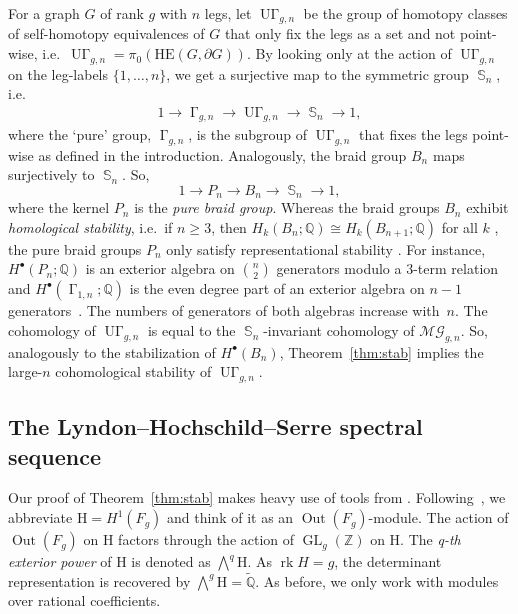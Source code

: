 \documentclass[oneside]{amsart}
\theoremstyle{remark}
\newcommand{\Q}{\mathbb{Q}}
\newcommand{\Z}{\mathbb{Z}}
\newcommand{\tQ}{\widetilde{\Q}}
\newcommand{\A}{{\operatorname{U\Gamma}}}
\newcommand{\PA}{{\operatorname{\Gamma}}}
\DeclareMathOperator{\SG}{{\mathbb S}}
\newcommand{\GL}{{\operatorname{GL}}}
\newcommand{\Out}{{\operatorname{Out}}}
\DeclareMathOperator{\rank}{\mathrm{rk}}
\newcommand{\MG}{\mathcal{MG}}
\begin{document}
For a graph $G$ of rank $g$ with $n$ legs, let $\A_{g,n}$ be the group of homotopy classes of self-homotopy equivalences of $G$ that only fix the legs as a set and not point-wise, i.e.~$\A_{g,n}=\pi_0(\mathrm{HE}(G,\partial G)).$
By looking only at the action of $\A_{g,n}$ on the leg-labels $\{1,\ldots,n\}$, we get a surjective map to the symmetric group $\SG_n$, i.e.
\begin{align*} 1 \rightarrow \PA_{g,n} \rightarrow \A_{g,n} \rightarrow \SG_n \rightarrow 1, \end{align*}
where the `pure' group, $\PA_{g,n}$, is the subgroup of $\A_{g,n}$ that fixes the legs point-wise as defined in the introduction.
Analogously, the braid group $B_n$ maps surjectively to $\SG_n$. So,
$$
1\rightarrow P_n \rightarrow B_n \rightarrow \SG_n \rightarrow 1,
$$
where the kernel $P_n$ is the \emph{pure braid group}.
Whereas the braid groups $B_n$ exhibit 
\emph{homological stability},
i.e.~if $n\geq 3$, then $H_k(B_n;\Q) \cong H_k(B_{n+1};\Q)$ for all $k$ \cite{arnol1969cohomology}, the pure braid groups $P_n$ only satisfy representational stability \cite{church2013representation}. 
For instance, $H^\bullet(P_n;\Q)$ is an exterior algebra on $\binom{n}{2}$ generators modulo a $3$-term relation~\cite{arnol1969cohomology} and $H^\bullet(\PA_{1,n};\Q)$ is the even degree part of an exterior algebra on $n-1$ generators~\cite{conant2016assembling}. The numbers of generators of both algebras increase with~$n$.
The cohomology of $\A_{g,n}$ is equal to the 
$\SG_n$-invariant cohomology of $\MG_{g,n}$. So, analogously to the stabilization of $H^\bullet(B_n)$, Theorem~\ref{thm:stab} implies the large-$n$ cohomological stability of $\A_{g,n}$.

%

\subsection{The Lyndon--Hochschild--Serre spectral sequence}
\label{sec:lerayserre}

Our proof of Theorem~\ref{thm:stab} 
makes heavy use of tools from \cite{conant2016assembling}.
Following~\cite{conant2016assembling}, we abbreviate $\mathrm H = H^1(F_g)$ and think of it as an $\Out(F_g)$-module. The action of $\Out(F_g)$ on $\mathrm H$ factors through the action of $\GL_g(\Z)$ on $\mathrm H$. The \emph{q-th exterior power} of $\mathrm H$ is denoted as $\bigwedge \nolimits^q \mathrm H$. As $\rank H = g$, the determinant representation is recovered by $\bigwedge \nolimits^g \mathrm H = \tQ$. As before, we only work with modules over rational coefficients.
\end{document}
